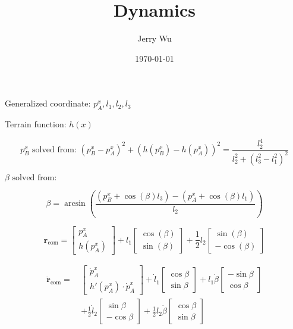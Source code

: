 \documentclass[10pt]{article}
\title{\textbf{Dynamics}}
\author{Jerry Wu}
\date{\today}
\begin{document}
\maketitle

\noindent
\begin{minipage}[t]{0.65\textwidth}
Generalized coordinate: \(p_A^x, l_1, l_2, l_3\)

\vspace{0.5em}

Terrain function: \(h(x)\)

\vspace{1em}

\[
p_B^x \text{ solved from: } (p_B^x - p_A^x)^2 + (h(p_B^x) - h(p_A^x))^2 = \frac{l_2^4}{l_2^2 + (l_3^2 - l_1^2)^2}
\]

\vspace{1em}

\(\beta \text{ solved from: } \)

\[
\beta = \arcsin\left( \frac{(p_B^x + \cos(\beta) l_3) - (p_A^x + \cos(\beta) l_1)}{l_2} \right)
\]


\vspace{1em}

\[
\mathbf{r}_{\mathrm{com}} =
\begin{bmatrix}
p_A^x \\
h(p_A^x)
\end{bmatrix}
+
l_1
\begin{bmatrix}
\cos(\beta) \\
\sin(\beta)
\end{bmatrix}
+
\frac{1}{2} l_2
\begin{bmatrix}
\sin(\beta) \\
-\cos(\beta)
\end{bmatrix}
\]

\begin{align*}
\dot{\mathbf{r}}_{\text{com}} =\ &
\begin{bmatrix}
\dot{p}_A^x \\
h'(p_A^x) \cdot \dot{p}_A^x
\end{bmatrix}
+
\dot{l}_1
\begin{bmatrix}
\cos\beta \\
\sin\beta
\end{bmatrix}
+
l_1 \dot{\beta}
\begin{bmatrix}
-\sin\beta \\
\cos\beta
\end{bmatrix} \\
&+
\frac{1}{2} \dot{l}_2
\begin{bmatrix}
\sin\beta \\
-\cos\beta
\end{bmatrix}
+
\frac{1}{2} l_2 \dot{\beta}
\begin{bmatrix}
\cos\beta \\
\sin\beta
\end{bmatrix}
\end{align*}


\end{minipage}
\end{document}
